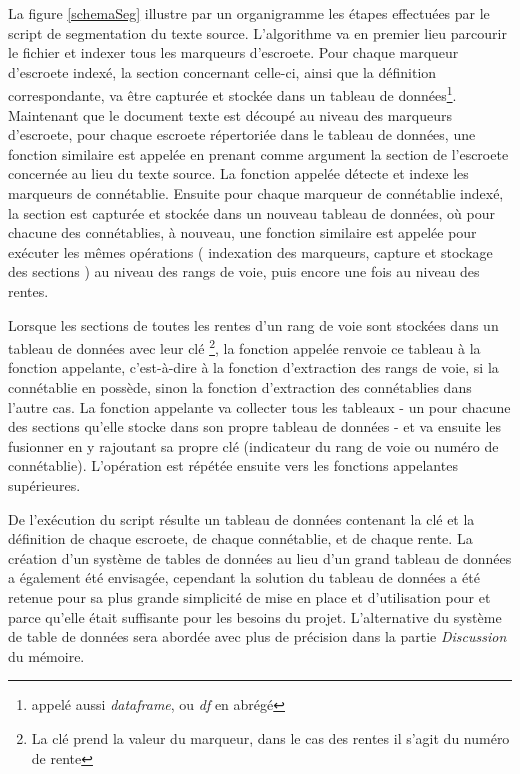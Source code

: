 La figure \ref{schemaSeg} illustre par un organigramme les étapes effectuées par le script de segmentation du texte source.
L’algorithme va en premier lieu parcourir le fichier et indexer tous les marqueurs d'escroete. Pour chaque marqueur d'escroete indexé, la section concernant celle-ci, ainsi que la définition correspondante, va être capturée et stockée dans un tableau de données\footnote{appelé aussi \textit{dataframe}, ou \textit{df} en abrégé}. Maintenant que le document texte est découpé au niveau des marqueurs d'escroete, pour chaque escroete répertoriée dans le tableau de données, une fonction similaire est appelée  en prenant comme argument la section de l'escroete concernée au lieu du texte source.
La fonction appelée détecte et indexe les marqueurs de connétablie. 
Ensuite pour chaque marqueur de connétablie indexé, la section est capturée et stockée dans un nouveau tableau de données, où pour chacune des connétablies, à nouveau, une fonction similaire est appelée pour exécuter les mêmes opérations ( indexation des marqueurs, capture et stockage des sections ) au niveau des rangs de voie, puis encore une fois au niveau des rentes.

Lorsque les sections de toutes les rentes d'un rang de voie sont stockées dans un tableau de données avec leur clé
\footnote{La clé prend la valeur du marqueur, dans le cas des rentes il s'agit du numéro de rente}, 
la fonction appelée renvoie ce tableau à la fonction appelante, c’est-à-dire à la fonction d'extraction des rangs de voie, si la connétablie en possède, sinon la fonction d'extraction des connétablies dans l'autre cas. La fonction appelante va collecter tous les tableaux - un pour chacune des sections qu'elle stocke dans son propre tableau de données - et va ensuite les fusionner en y rajoutant sa propre clé (indicateur du rang de voie ou numéro de connétablie). L'opération est répétée ensuite vers les fonctions appelantes supérieures.

De l'exécution du script résulte un tableau de données contenant la clé et la définition de chaque escroete, de chaque connétablie, et de chaque rente. La création d'un système de tables de données au lieu d'un grand tableau de données a également été envisagée, cependant la solution du tableau de données a été retenue pour sa plus grande simplicité de mise en place et d'utilisation pour et parce qu'elle était suffisante pour les besoins du projet. L'alternative du système de table de données sera abordée avec plus de précision  dans la partie \textit{Discussion} du mémoire.

